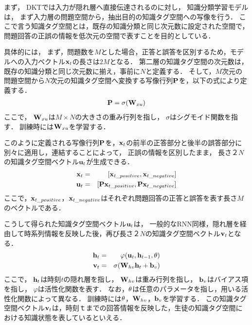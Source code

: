 まず，
DKTでは入力が隠れ層へ直接伝達されるのに対し，
知識分類学習モデルは，
まず入力層の問題空間から，抽出目的の知識タグ空間への写像を行う．
ここで言う知識タグ空間とは，既存の知識分類と同じ次元数に設定された空間で，
問題回答の正誤の情報を低次元の空間で表すことを目的としている．

具体的には，
まず，問題数を$M$とした場合，正答と誤答を区別するため，モデルへの入力ベクトル${\bf x}_t$の長さは$2M$となる．
第二層の知識タグ空間の次元数は，既存の知識分類と同じ次元数に揃え，事前に$N$と定義する．
そして，$M$次元の問題空間から$N$次元の知識タグ空間へ変換する写像行列${\bf P}$を，以下の式により定義する．
\begin{eqnarray}
\label{eq:p}
{\bf P} = \sigma( {\bf W}_{xu})
\end{eqnarray}
ここで，
${\bf W}_{xu}$は$M \times N$の大きさの重み行列を指し，
$\sigma$はシグモイド関数を指す．
訓練時には${\bf W}_{xu}$を学習する．

このように定義される写像行列${\bf P}$を，${\bf x}_t$の前半の正答部分と後半の誤答部分に別々に適用し，連結することによって，
正誤の情報を区別したまま，
長さ$２N$の知識タグ空間ベクトル${\bf u}_t$が生成できる．
\begin{eqnarray}
{\bf x}_t &=& [{\bf x}_{t\_positive}, {\bf x}_{t\_negative}]\\
{\bf u}_t &=& [{\bf P} {\bf x}_{t\_positive}, {\bf P} {\bf x}_{t\_negative}]
\end{eqnarray}
ここで，${\bf x}_{t\_positive}$，${\bf x}_{t\_negative}$はそれぞれ問題回答の正答と誤答を表す長さ$M$のベクトルである．

こうして得られた知識タグ空間ベクトル${\bf u}_t$は，
一般的なRNN同様，隠れ層を経由して時系列情報を反映した後，再び長さ$２N$の知識タグ空間ベクトル${\bf v}_t$となる．
\begin{eqnarray}
{\bf h}_t &=& \varphi({\bf u}_t, {\bf h}_{t-1}, {\bf \theta})\\
{\bf v}_t &=& \sigma( {\bf W}_{hv} {\bf h}_t + {\bf b}_v)
\end{eqnarray}
ここで，
${\bf h}_t$は時刻$t$の隠れ層を指し，
${\bf W}_{hv}$は重み行列を指し，
${\bf b}_v$はバイアス項を指し，
$\varphi$は活性化関数を表す．
なお，${\bf \theta}$は任意のパラメータを指し，用いる活性化関数によって異なる．
訓練時には${\bf \theta}$，${\bf W}_{hv}$，${\bf b}_v$を学習する．
この知識タグ空間ベクトル${\bf v}_t$は，時刻$ｔ$までの回答情報を反映した，生徒の知識タグ空間における知識状態を表しているといえる．

